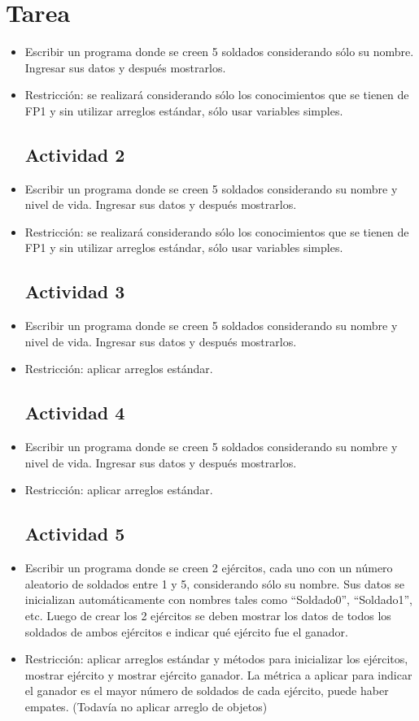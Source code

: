 \documentclass{article}
\begin{document}
	\section{Tarea}
	\begin{itemize}
		\subsection{Actividad 1}
			\item Escribir un programa donde se creen 5 soldados considerando sólo su nombre. Ingresar sus datos y
después mostrarlos.
			\item Restricción: se realizará considerando sólo los conocimientos que se tienen de FP1 y sin utilizar arreglos estándar,
sólo usar variables simples.
		\subsection{Actividad 2}
			\item Escribir un programa donde se creen 5 soldados considerando su nombre y nivel de vida. Ingresar sus datos y después mostrarlos.
			\item Restricción: se realizará considerando sólo los conocimientos que se tienen de FP1 y sin utilizar arreglos estándar,
sólo usar variables simples.
		\subsection{Actividad 3}
			\item Escribir un programa donde se creen 5 soldados considerando su nombre y nivel de vida. Ingresar sus datos y después mostrarlos.
			\item Restricción: aplicar arreglos estándar.
		\subsection{Actividad 4}
			\item Escribir un programa donde se creen 5 soldados considerando su nombre y nivel de vida. Ingresar sus datos y después mostrarlos.
			\item Restricción: aplicar arreglos estándar.
		\subsection{Actividad 5}
			\item Escribir un programa donde se creen 2 ejércitos, cada uno con un número aleatorio de soldados entre
1 y 5, considerando sólo su nombre. Sus datos se inicializan automáticamente con nombres tales como “Soldado0”,
“Soldado1”, etc. Luego de crear los 2 ejércitos se deben mostrar los datos de todos los soldados de ambos ejércitos
e indicar qué ejército fue el ganador.
			\item Restricción: aplicar arreglos estándar y métodos para inicializar los ejércitos, mostrar ejército y mostrar ejército
ganador. La métrica a aplicar para indicar el ganador es el mayor número de soldados de cada ejército, puede
haber empates. (Todavía no aplicar arreglo de objetos)
	\end{itemize}
		
\end{document}
